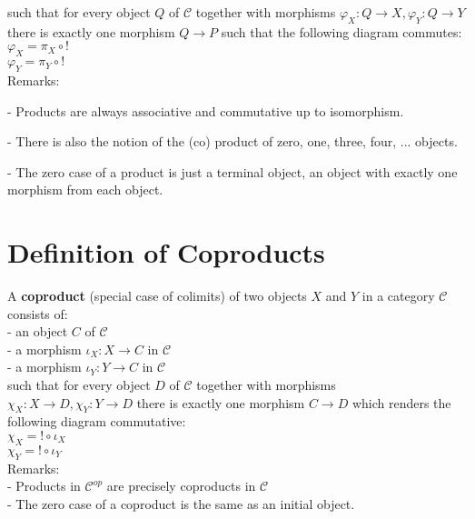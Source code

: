 \documentclass[a4paper, twoside, english, 11pt]{book}
\newcommand{\C}{\mathcal C}
\begin{document}
\noindent
such that for every object $Q$ of $\C$ together with morphisms $\varphi_X : Q \rightarrow X, \varphi_Y : Q \rightarrow Y$ there is exactly one morphism $Q \rightarrow P$ such that the following diagram commutes: \\

$\varphi_X = \pi_X \circ !$ \\
\indent
$\varphi_Y = \pi_Y \circ !$ \\

\noindent
Remarks:

- Products are always associative and commutative up to isomorphism.

- There is also the notion of the (co) product of zero, one, three, four, ... objects.

- The zero case of a product is just a terminal object, an object with exactly one morphism from each object.



\section{Definition of Coproducts}

A \textbf{coproduct} (special case of colimits) of two objects $X$ and $Y$ in a category $\C$ consists of: \\

- an object $C$ of $\C$ \\

- a morphism $\iota_X : X \rightarrow C$ in $\C$ \\

- a morphism $\iota_Y : Y \rightarrow C$ in $\C$ \\

\noindent
such that for every object $D$ of $\C$ together with morphisms $\chi_X : X \rightarrow D, \chi_Y : Y \rightarrow D$ there is exactly one morphism $C \rightarrow D$ which renders the following diagram commutative: \\

$\chi_X = ! \circ \iota_X$ \\
\indent
$\chi_Y = ! \circ  \iota_Y$ \\

\noindent
Remarks: \\

- Products in $\C^{op}$ are precisely coproducts in $\C$ \\

- The zero case of a coproduct is the same as an initial object.
\end{document}
